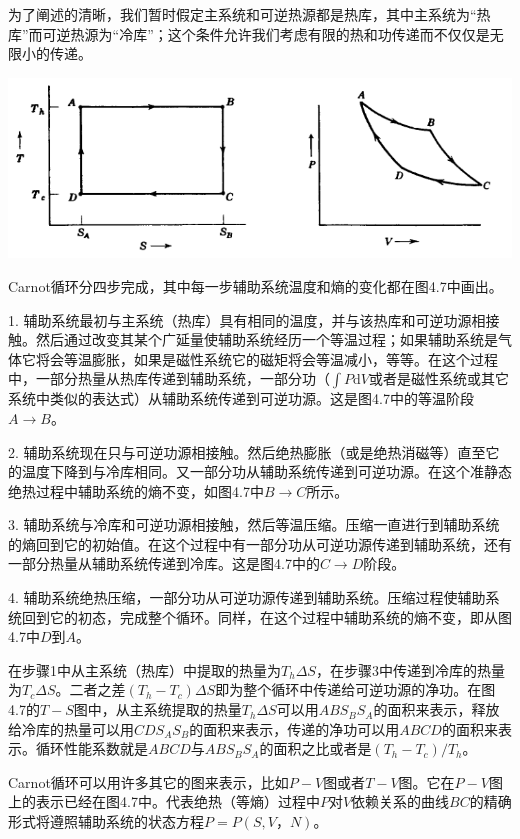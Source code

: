 为了阐述的清晰，我们暂时假定主系统和可逆热源都是热库，其中主系统为“热库”而可逆热源为“冷库”；这个条件允许我们考虑有限的热和功传递而不仅仅是无限小的传递。

{
	\centering
	\includegraphics[scale=0.7]{Pictures/fig4.7.png}
}

Carnot循环分四步完成，其中每一步辅助系统温度和熵的变化都在图4.7中画出。

1. 辅助系统最初与主系统（热库）具有相同的温度，并与该热库和可逆功源相接触。然后通过改变其某个广延量使辅助系统经历一个等温过程；如果辅助系统是气体它将会等温膨胀，如果是磁性系统它的磁矩将会等温减小，等等。在这个过程中，一部分热量从热库传递到辅助系统，一部分功（$\int P\text{d}V$或者是磁性系统或其它系统中类似的表达式）从辅助系统传递到可逆功源。这是图4.7中的等温阶段$A\rightarrow B$。

2. 辅助系统现在只与可逆功源相接触。然后绝热膨胀（或是绝热消磁等）直至它的温度下降到与冷库相同。又一部分功从辅助系统传递到可逆功源。在这个准静态绝热过程中辅助系统的熵不变，如图4.7中$B\rightarrow C$所示。

3. 辅助系统与冷库和可逆功源相接触，然后等温压缩。压缩一直进行到辅助系统的熵回到它的初始值。在这个过程中有一部分功从可逆功源传递到辅助系统，还有一部分热量从辅助系统传递到冷库。这是图4.7中的$C\rightarrow D$阶段。

4. 辅助系统绝热压缩，一部分功从可逆功源传递到辅助系统。压缩过程使辅助系统回到它的初态，完成整个循环。同样，在这个过程中辅助系统的熵不变，即从图4.7中$D$到$A$。

在步骤1中从主系统（热库）中提取的热量为$T_h\Delta S$，在步骤3中传递到冷库的热量为$T_c\Delta S$。二者之差$(T_h - T_c)\Delta S$即为整个循环中传递给可逆功源的净功。在图4.7的$T-S$图中，从主系统提取的热量$T_h\Delta S$可以用$ABS_BS_A$的面积来表示，释放给冷库的热量可以用$CDS_AS_B$的面积来表示，传递的净功可以用$ABCD$的面积来表示。循环性能系数就是$ABCD$与$ABS_BS_A$的面积之比或者是$(T_h - T_c)/T_h$。

Carnot循环可以用许多其它的图来表示，比如$P-V$图或者$T-V$图。它在$P-V$图上的表示已经在图4.7中。代表绝热（等熵）过程中$P$对$V$依赖关系的曲线$BC$的精确形式将遵照辅助系统的状态方程$P = P(S,V，N)$。

